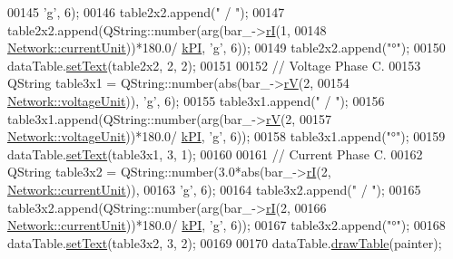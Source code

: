 \begin{DoxyCode}
00145                                      \textcolor{charliteral}{'g'}, 6);
00146   table2x2.append(\textcolor{stringliteral}{" / "});
00147   table2x2.append(QString::number(arg(bar\_->\hyperlink{group___models_ga50eb46f3510205a9d6cb5e6547fa86df}{rI}(1,
00148                                       \hyperlink{group___models_gac6a26db5fef2b1dd2a00faf6340d1702}{Network::currentUnit}))*180.0/
      \hyperlink{math__constants_8h_a368d99984512d9a6c6f18b37b4446431}{kPI}, \textcolor{charliteral}{'g'}, 6));
00149   table2x2.append(\textcolor{stringliteral}{"°"});
00150   dataTable.\hyperlink{class_data_table_aee0d28c77116b51360f0124a529cb3ff}{setText}(table2x2, 2, 2);
00151 
00152   \textcolor{comment}{// Voltage Phase C.}
00153   QString table3x1 = QString::number(abs(bar\_->\hyperlink{group___models_ga6c83eb997f5038e0b9bbd5472582e0a8}{rV}(2,
00154                                          \hyperlink{group___models_gacde031ef95f5c05565ee35769f2ed89e}{Network::voltageUnit})), \textcolor{charliteral}{'g'}, 6);
00155   table3x1.append(\textcolor{stringliteral}{" / "});
00156   table3x1.append(QString::number(arg(bar\_->\hyperlink{group___models_ga6c83eb997f5038e0b9bbd5472582e0a8}{rV}(2,
00157                                       \hyperlink{group___models_gacde031ef95f5c05565ee35769f2ed89e}{Network::voltageUnit}))*180.0/
      \hyperlink{math__constants_8h_a368d99984512d9a6c6f18b37b4446431}{kPI}, \textcolor{charliteral}{'g'}, 6));
00158   table3x1.append(\textcolor{stringliteral}{"°"});
00159   dataTable.\hyperlink{class_data_table_aee0d28c77116b51360f0124a529cb3ff}{setText}(table3x1, 3, 1);
00160 
00161   \textcolor{comment}{// Current Phase C.}
00162   QString table3x2 = QString::number(3.0*abs(bar\_->\hyperlink{group___models_ga50eb46f3510205a9d6cb5e6547fa86df}{rI}(2, \hyperlink{group___models_gac6a26db5fef2b1dd2a00faf6340d1702}{Network::currentUnit})),
00163                                      \textcolor{charliteral}{'g'}, 6);
00164   table3x2.append(\textcolor{stringliteral}{" / "});
00165   table3x2.append(QString::number(arg(bar\_->\hyperlink{group___models_ga50eb46f3510205a9d6cb5e6547fa86df}{rI}(2,
00166                                       \hyperlink{group___models_gac6a26db5fef2b1dd2a00faf6340d1702}{Network::currentUnit}))*180.0/
      \hyperlink{math__constants_8h_a368d99984512d9a6c6f18b37b4446431}{kPI}, \textcolor{charliteral}{'g'}, 6));
00167   table3x2.append(\textcolor{stringliteral}{"°"});
00168   dataTable.\hyperlink{class_data_table_aee0d28c77116b51360f0124a529cb3ff}{setText}(table3x2, 3, 2);
00169 
00170   dataTable.\hyperlink{class_data_table_a3a3695e88dcd4d4aad5cc941ec7e6e55}{drawTable}(painter);

\end{DoxyCode}
